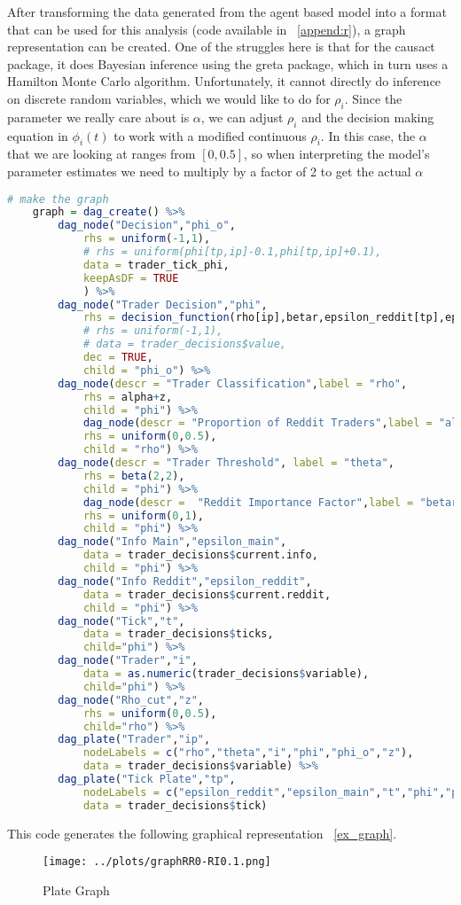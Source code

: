 \documentclass[a4paper, 11pt]{report}
\begin{document}
After transforming the data generated from the agent based model into a format that can be used for this analysis (code available in ~\autoref{append:r}), a graph representation can be created. One of the struggles here is that for the causact package, it does Bayesian inference using the greta package, which in turn uses a Hamilton Monte Carlo algorithm. Unfortunately, it cannot directly do inference on discrete random variables, which we would like to do for $\rho_{i}$. Since the parameter we really care about is $\alpha$, we can adjust $\rho_{i}$ and the decision making equation in $\phi_{i}(t)$ to work with a modified continuous $\rho_{i}$. In this case, the $\alpha$ that we are looking at ranges from $[0,0.5]$, so when interpreting the model's parameter estimates we need to multiply by a factor of 2 to get the actual $\alpha$
\begin{lstlisting}[language=R]
  # make the graph
	graph = dag_create() %>%
		dag_node("Decision","phi_o",
			rhs = uniform(-1,1),
			# rhs = uniform(phi[tp,ip]-0.1,phi[tp,ip]+0.1),
			data = trader_tick_phi,
			keepAsDF = TRUE
			) %>%
		dag_node("Trader Decision","phi",
			rhs = decision_function(rho[ip],betar,epsilon_reddit[tp],epsilon_main[tp],theta[ip]),
			# rhs = uniform(-1,1),
			# data = trader_decisions$value,
			dec = TRUE,
			child = "phi_o") %>%
		dag_node(descr = "Trader Classification",label = "rho",
			rhs = alpha+z,
			child = "phi") %>%
			dag_node(descr = "Proportion of Reddit Traders",label = "alpha",
			rhs = uniform(0,0.5),
			child = "rho") %>%
		dag_node(descr = "Trader Threshold", label = "theta",
			rhs = beta(2,2),
			child = "phi") %>%
			dag_node(descr =  "Reddit Importance Factor",label = "betar",
			rhs = uniform(0,1),
			child = "phi") %>%
		dag_node("Info Main","epsilon_main",
			data = trader_decisions$current.info,
			child = "phi") %>%
		dag_node("Info Reddit","epsilon_reddit",
			data = trader_decisions$current.reddit,
			child = "phi") %>%
		dag_node("Tick","t",
			data = trader_decisions$ticks,
			child="phi") %>%
		dag_node("Trader","i",
			data = as.numeric(trader_decisions$variable),
			child="phi") %>%
		dag_node("Rho_cut","z",
			rhs = uniform(0,0.5),
			child="rho") %>%
		dag_plate("Trader","ip",
			nodeLabels = c("rho","theta","i","phi","phi_o","z"),
			data = trader_decisions$variable) %>%
		dag_plate("Tick Plate","tp",
			nodeLabels = c("epsilon_reddit","epsilon_main","t","phi","phi_o"),
			data = trader_decisions$tick)
\end{lstlisting}
This code generates the following graphical representation ~\autoref{ex_graph}.
\begin{figure}[h!]
	\caption{Plate Graph}
	\label{ex_graph}
	\texttt{[image: ../plots/graphRR0-RI0.1.png]}
\end{figure}
\end{document}
